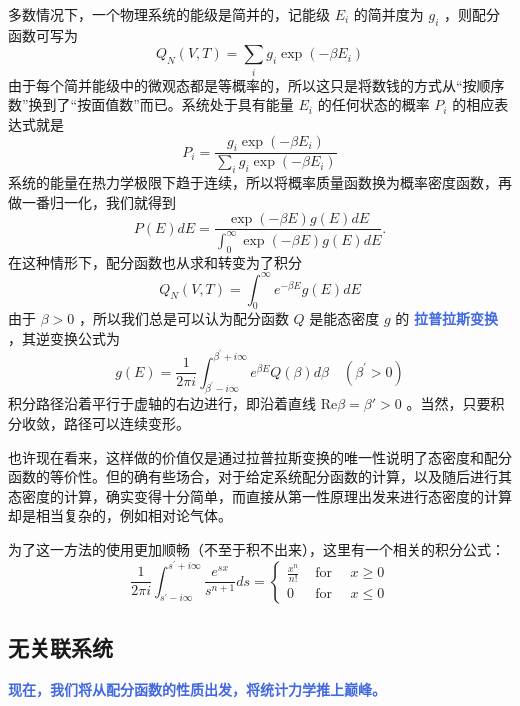 多数情况下，一个物理系统的能级是简并的，记能级 $E_i$ 的简并度为 $g_i$ ，则配分函数可写为
\begin{equation}
    Q_N(V, T)=\sum_i g_i \exp \left(-\beta E_i\right)
\end{equation}
由于每个简并能级中的微观态都是等概率的，所以这只是将数钱的方式从“按顺序数”换到了“按面值数”而已。系统处于具有能量 $E_i$ 的任何状态的概率 $P_i$ 的相应表达式就是
\begin{equation}
    P_i=\frac{g_i \exp \left(-\beta E_i\right)}{\sum_i g_i \exp \left(-\beta E_i\right)}
\end{equation}
系统的能量在热力学极限下趋于连续，所以将概率质量函数换为概率密度函数，再做一番归一化，我们就得到
\begin{equation}
    P(E) d E=\frac{\exp (-\beta E) g(E) d E}{\int_0^{\infty} \exp (-\beta E) g(E) d E} .
\end{equation}
在这种情形下，配分函数也从求和转变为了积分
\begin{equation}
    Q_N(V, T)=\int_0^{\infty} e^{-\beta E} g(E) d E
\end{equation}
由于 $\beta>0$ ，所以我们总是可以认为配分函数 $Q$ 是能态密度 $g$ 的 \textcolor{RoyalBlue}{\textbf{\kaishu 拉普拉斯变换}} ，其逆变换公式为
\begin{equation}
    g(E)=\frac{1}{2 \pi i} \int_{\beta^{\prime}-i \infty}^{\beta^{\prime}+i \infty} e^{\beta E} Q(\beta) d \beta \quad\left(\beta^{\prime}>0\right)
\end{equation}
积分路径沿着平行于虚轴的右边进行，即沿着直线 $\text{Re}\beta = \beta' >0$ 。当然，只要积分收敛，路径可以连续变形。

也许现在看来，这样做的价值仅是通过拉普拉斯变换的唯一性说明了态密度和配分函数的等价性。但的确有些场合，对于给定系统配分函数的计算，以及随后进行其态密度的计算，确实变得十分简单，而直接从第一性原理出发来进行态密度的计算却是相当复杂的，例如相对论气体。

为了这一方法的使用更加顺畅（不至于积不出来），这里有一个相关的积分公式：
\[
    \frac{1}{2 \pi i} \int_{s^{\prime}-i \infty}^{s^{\prime}+i \infty} \frac{e^{s x}}{s^{n+1}} d s=\left\{\begin{array}{lll}
        \frac{x^n}{n !} & \text { for } \quad x \geq 0 \\
        0 & \text { for } \quad x \leq 0
        \end{array}\right.
\]

\subsection{无关联系统}
\textcolor{RoyalBlue}{\textbf{\kaishu 现在，我们将从配分函数的性质出发，将统计力学推上巅峰。}}

